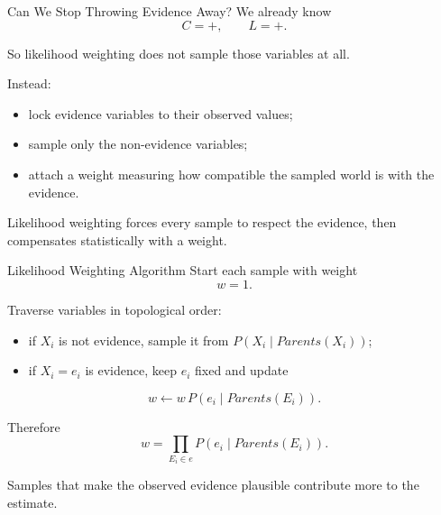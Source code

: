 \documentclass[aspectratio=169,10pt]{beamer}
\begin{document}
\begin{frame}[shrink=10]{Can We Stop Throwing Evidence Away?}
  We already know
  \[
    C=+,\qquad L=+.
  \]

  So likelihood weighting does not sample those variables at all.

  Instead:
  \begin{itemize}
    \item lock evidence variables to their observed values;
    \item sample only the non-evidence variables;
    \item attach a weight measuring how compatible the sampled world is with the evidence.
  \end{itemize}

  \begin{keyidea}
    Likelihood weighting forces every sample to respect the evidence, then compensates statistically with a weight.
  \end{keyidea}
\end{frame}

\begin{frame}[shrink=10]{Likelihood Weighting Algorithm}
  Start each sample with weight
  \[
    w=1.
  \]

  Traverse variables in topological order:
  \begin{itemize}
    \item if $X_i$ is not evidence, sample it from $P(X_i\mid Parents(X_i))$;
    \item if $X_i=e_i$ is evidence, keep $e_i$ fixed and update
  \end{itemize}

  \[
    w \leftarrow w\,P(e_i\mid Parents(E_i)).
  \]

  Therefore
  \[
    w=\prod_{E_i\in e}P(e_i\mid Parents(E_i)).
  \]

  \begin{keyidea}
    Samples that make the observed evidence plausible contribute more to the estimate.
  \end{keyidea}
\end{frame}
\end{document}
